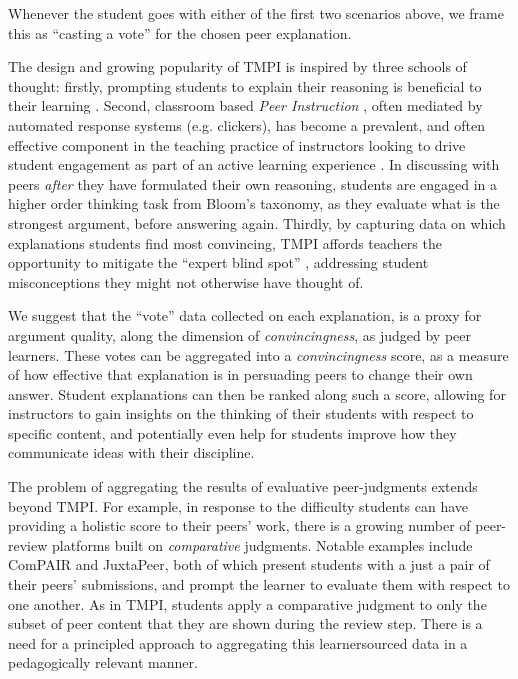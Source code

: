 \documentclass[notitlepage,12pt]{jedm}
\begin{document}
Whenever the student goes with either of the first two scenarios above, we 
frame this as ``casting a vote'' for the chosen peer explanation.

The design and growing popularity of TMPI is inspired by three schools of 
thought: firstly, prompting students to explain their reasoning is beneficial 
to their learning \cite{chi_eliciting_1994}. 
Second, classroom based \textit{Peer Instruction} \cite{crouch_peer_2001}, 
often 
mediated by automated response systems (e.g. clickers), has become a prevalent, 
and often effective component in the teaching practice of instructors looking 
to drive student engagement as part of an active learning experience 
\cite{charles_beyond_2015}. 
In discussing with peers \textit{after} they have formulated their own 
reasoning, students are engaged in a higher order thinking task from Bloom's 
taxonomy, as they evaluate what is the strongest argument, before answering 
again.
Thirdly, by capturing data on which explanations students find most convincing, 
TMPI affords teachers the opportunity to mitigate the ``expert blind spot'' 
\cite{nathan_expert_2001}, addressing student misconceptions they might not 
otherwise have thought of.

We suggest that the ``vote'' data collected on each explanation, is a proxy for 
argument quality, along the dimension of \textit{convincingness}, as judged by 
peer learners. 
These votes can be aggregated into a \textit{convincingness} score, as a 
measure of how effective that explanation is in persuading peers to change 
their own answer.
Student explanations can then be ranked along such a score, allowing for 
instructors to gain insights on the thinking of their students with respect to 
specific content, and potentially even help for students improve how they 
communicate ideas with their discipline.

The problem of aggregating the results of evaluative peer-judgments extends  
beyond TMPI.
For example, in response to the difficulty students can have providing a 
holistic score to their peers' work, there is a growing number of peer-review 
platforms built on \textit{comparative} judgments.
Notable examples include ComPAIR\cite{potter_compair:_2017} and 
JuxtaPeer\cite{cambre_juxtapeer:_2018}, both of which present students with a 
just a pair of their peers' submissions, and prompt the learner to evaluate 
them with respect to one another.
As in TMPI, students apply a comparative judgment to only the subset of peer 
content that they are shown during the review step.
There is a need for a principled approach to aggregating this learnersourced 
data in a pedagogically relevant manner.
\end{document}
